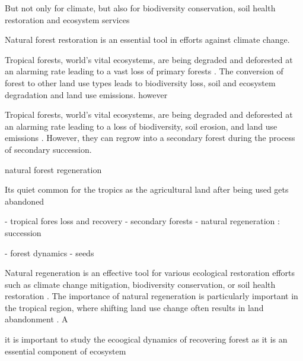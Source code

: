 But not only for climate, but also for biodiversity conservation, soil health restoration and ecosystem services

Natural forest restoration is an essential tool in efforts against climate change.

Tropical forests, world's vital ecosystems, are being degraded and deforested at an alarming rate leading to a vast loss of primary forests \citep{lopez-bedoyaPrimaryForestLoss2022}. The conversion of forest to other land use types leads to biodiversity loss, soil and ecosystem degradation and land use emissions. however

Tropical forests, world's vital ecosystems, are being degraded and deforested at an alarming rate leading to a loss of biodiversity, soil erosion, and land use emissions \citep{lopez-bedoyaPrimaryForestLoss2022}. However, they can regrow into a secondary forest during the process of secondary succession. 

natural forest regeneration 

Its quiet common for the tropics as the agricultural land after being used gets abandoned

- tropical fores loss and recovery
- secondary forests
- natural regeneration : succession

- forest dynamics
- seeds

Natural regeneration is an effective tool for various ecological restoration efforts such as climate change mitigation, biodiversity conservation, or soil health restoration \citep{hordijkLandUseHistory2024}. The importance of natural regeneration is particularly important in the tropical region, where shifting land use change often results in land abandonment . A

it is important to study the ecoogical dynamics of recovering forest as it is an essential component of ecosystem 


